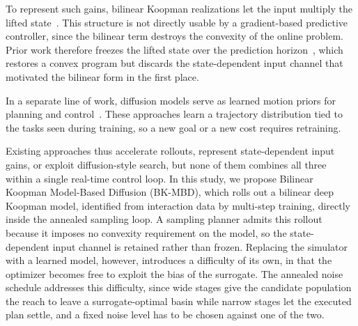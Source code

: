 \documentclass[letterpaper,10pt,conference]{ieeeconf}
\newcommand{\bkmbd}{\textsc{BK-MBD}}
\begin{document}
To represent such gains, bilinear Koopman realizations let the input multiply the lifted state~\cite{iacob2024}.
This structure is not directly usable by a gradient-based predictive controller, since the bilinear term destroys the convexity of the online problem.
Prior work therefore freezes the lifted state over the prediction horizon~\cite{bruder2021bilinear}, which restores a convex program but discards the state-dependent input channel that motivated the bilinear form in the first place.

In a separate line of work, diffusion models serve as learned motion priors for planning and control~\cite{janner2022planning, chi2025diffusion, carvalho2023motion}.
These approaches learn a trajectory distribution tied to the tasks seen during training, so a new goal or a new cost requires retraining.

Existing approaches thus accelerate rollouts, represent state-dependent input gains, or exploit diffusion-style search, but none of them combines all three within a single real-time control loop.
In this study, we propose Bilinear Koopman Model-Based Diffusion (\bkmbd{}), which rolls out a bilinear deep Koopman model, identified from interaction data by multi-step training, directly inside the annealed sampling loop.
A sampling planner admits this rollout because it imposes no convexity requirement on the model, so the state-dependent input channel is retained rather than frozen.
Replacing the simulator with a learned model, however, introduces a difficulty of its own, in that the optimizer becomes free to exploit the bias of the surrogate.
The annealed noise schedule addresses this difficulty, since wide stages give the candidate population the reach to leave a surrogate-optimal basin while narrow stages let the executed plan settle, and a fixed noise level has to be chosen against one of the two.
\end{document}
